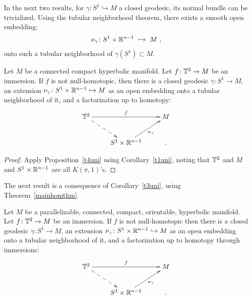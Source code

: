In the next two results, for $\gamma\colon S^1 \hookrightarrow M$ a closed geodesic, its normal bundle can be trivialized.
Using the tubular neighborhood theorem, there exists a smooth open embedding:
\[
\nu_\gamma\colon S^1\times \mathbb R^{n-1}
~ \hookrightarrow ~
M
~,
\]
onto such a tubular neighborhood of $\gamma(S^1)\subset M$.
\begin{cor}
\label{t3uni}
Let $M$ be a connected compact hyperbolic manifold.
Let $f \colon \mathbb T^2 \to M$ be an immersion.
If $f$ is not null-homotopic, then there is a closed geodesic $\gamma \colon S^1 \to M$, an extension $\nu_\gamma \colon S^1 \times \mathbb R^{n-1} \hookrightarrow M$ as an open embedding onto a tubular neighborhood of it, and a factorization up to homotopy:
\[
\xymatrix{
\TT^2
\ar[rr]^-{f}
\ar@{-->}[dr]
&&
M
\\
&
S^1\times \RR^{n-1}
\ar[ur]_-{\nu_\gamma}
&
.
}
\]

\end{cor}
\begin{proof}
Apply Proposition~\ref{t4uni} using Corollary~\ref{t1uni}, noting that $\mathbb T^2$ and $M$ and $S^1 \times \mathbb R^{n-1}$ are all $K(\pi,1)$'s.
\end{proof}

The next result is a consequence of Corollary~\ref{t3uni}, using Theorem~\ref{mainhomthm}. 
\begin{cor}
\label{t5uni}
Let $M$ be a parallelizable, connected, compact, orientable, hyperbolic manifold.
Let $f \colon \mathbb T^2 \to M$ be an immersion.
If $f$ is not null-homotopic then there is a closed geodesic $\gamma \colon S^1 \to M$, an extension $\nu_\gamma \colon S^1 \times \mathbb R^{n-1} \hookrightarrow M$ as an open embedding onto a tubular neighborhood of it, and a factorization up to homotopy through immersions:
\[
\xymatrix{
\TT^2
\ar[rr]^-{f}
\ar@{-->}[dr]
&&
M
\\
&
S^1\times \RR^{n-1}
\ar[ur]_-{\nu_\gamma}
&
.
}
\]
\end{cor}

